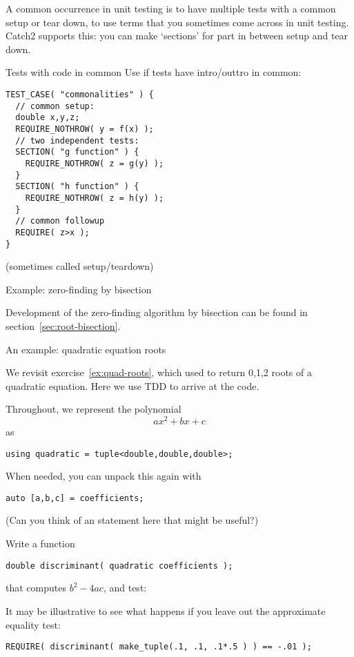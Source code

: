 A common occurrence in unit testing is to have
multiple tests with a common setup or tear down,
to use terms that you sometimes come across in unit testing.
Catch2 supports this:
you can make `sections' for part in between setup and tear down.

\begin{block}{Tests with code in common}
\label{sl:catch-section}
Use  if tests have intro/outtro in common:
\begin{lstlisting}
TEST_CASE( "commonalities" ) {
  // common setup:
  double x,y,z;
  REQUIRE_NOTHROW( y = f(x) );
  // two independent tests:
  SECTION( "g function" ) {
    REQUIRE_NOTHROW( z = g(y) );
  }
  SECTION( "h function" ) {
    REQUIRE_NOTHROW( z = h(y) );
  }
  // common followup
  REQUIRE( z>x );
}
\end{lstlisting}
(sometimes called setup/teardown)
\end{block}

 {Example: zero-finding by bisection}

Development of the zero-finding algorithm by bisection
can be found in section~\ref{sec:root-bisection}.

 {An example: quadratic equation roots}
\label{sec:quad-tdd}

We revisit exercise~\ref{ex:quad-roots},
which used 
to return 0,1,2 roots of a quadratic equation.
Here we use \ac{TDD} to arrive at the code.

Throughout, we represent the polynomial
\[ ax^2+bx+c \]
as 
\begin{lstlisting}
using quadratic = tuple<double,double,double>;  
\end{lstlisting}
When needed, you can unpack this again with
\begin{lstlisting}
auto [a,b,c] = coefficients;  
\end{lstlisting}
(Can you think of an  statement here
that might be useful?)

\begin{exercise}
  \label{ex:qdisc}
  Write a function
\begin{lstlisting}
double discriminant( quadratic coefficients );
\end{lstlisting}
that computes $b^2-4ac$, and test:
\end{exercise}

It may be illustrative to see what happens if you leave out the
approximate equality test:
\begin{lstlisting}
REQUIRE( discriminant( make_tuple(.1, .1, .1*.5 ) ) == -.01 );
\end{lstlisting}

